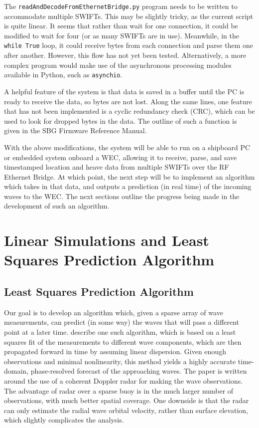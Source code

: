 \documentclass[11pt]{article}
\begin{document}
The \texttt{readAndDecodeFromEthernetBridge.py} program needs to be written to accommodate multiple SWIFTs.  This may be slightly tricky, as the current script is quite linear.  It seems that rather than wait for one connection, it could be modified to wait for four (or as many SWIFTs are in use).  Meanwhile, in the \texttt{while True} loop, it could receive bytes from each connection and parse them one after another.  However, this flow has not yet been tested.  Alternatively, a more complex program would make use of the asynchronous processing modules available in Python, such as \texttt{asynchio}.

A helpful feature of the system is that data is saved in a buffer until the PC is ready to receive the data, so bytes are not lost.  Along the same lines, one feature that has not been implemented is a cyclic redundancy check (CRC), which can be used to look for dropped bytes in the data.  The outline of such a function is given in the SBG Firmware Reference Manual.

With the above modifications, the system will be able to run on a shipboard PC or embedded system onboard a WEC, allowing it to receive, parse, and save timestamped location and heave data from multiple SWIFTs over the RF Ethernet Bridge.  At which point, the next step will be to implement an algorithm which takes in that data, and outputs a prediction (in real time) of the incoming waves to the WEC.  The next sections outline the progress being made in the development of such an algorithm.

\section{Linear Simulations and Least Squares Prediction Algorithm}

\subsection{Least Squares Prediction Algorithm}

Our goal is to develop an algorithm which, given a sparse array of wave measurements, can predict (in some way) the waves that will pass a different point at a later time.  \citet{Connell:2015} describe one such algorithm, which is based on a least squares fit of the measurements to different wave components, which are then propagated forward in time by assuming linear dispersion.  Given enough observations and minimal nonlinearity, this method yields a highly accurate time-domain, phase-resolved forecast of the approaching waves.  The  \citet{Connell:2015} paper is written around the use of a coherent Doppler radar for making the wave observations.  The advantage of radar over a sparse buoy is in the much larger number of observations, with much better spatial coverage.  One downside is that the radar can only estimate the radial wave orbital velocity, rather than surface elevation, which slightly complicates the analysis.  
\end{document}
